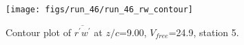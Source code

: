 \begin{figure}[H]
\centering
\texttt{[image: figs/run\_46/run\_46\_rw\_contour]}
\caption{Contour plot of $\overline{r^\prime w^\prime}$ at $z/c$=9.00, $V_{free}$=24.9, station 5.}
\end{figure}


